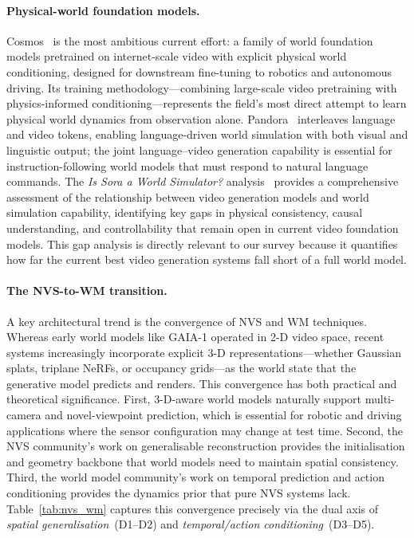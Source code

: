 \paragraph{Physical-world foundation models.}
Cosmos~\citep{agarwal2025cosmos} is the most ambitious current effort: a family
of world foundation models pretrained on internet-scale video with explicit
physical world conditioning, designed for downstream fine-tuning to robotics
and autonomous driving.
Its training methodology---combining large-scale video pretraining with
physics-informed conditioning---represents the field's most direct attempt
to learn physical world dynamics from observation alone.
Pandora~\citep{xiang2024pandora} interleaves language and video tokens,
enabling language-driven world simulation with both visual and linguistic output;
the joint language--video generation capability is essential for instruction-following
world models that must respond to natural language commands.
The \emph{Is Sora a World Simulator?} analysis~\citep{zhu2024sora_survey}
provides a comprehensive assessment of the relationship between video generation
models and world simulation capability, identifying key gaps in physical
consistency, causal understanding, and controllability that remain open
in current video foundation models.
This gap analysis is directly relevant to our survey because it quantifies how
far the current best video generation systems fall short of a full world model.

\paragraph{The NVS-to-WM transition.}
A key architectural trend is the convergence of NVS and WM techniques.
Whereas early world models like GAIA-1 operated in 2-D video space,
recent systems increasingly incorporate explicit 3-D representations---whether
Gaussian splats, triplane NeRFs, or occupancy grids---as the world state
that the generative model predicts and renders.
This convergence has both practical and theoretical significance.
First, 3-D-aware world models naturally support multi-camera and novel-viewpoint
prediction, which is essential for robotic and driving applications where the
sensor configuration may change at test time.
Second, the NVS community's work on generalisable reconstruction provides the
initialisation and geometry backbone that world models need to maintain spatial
consistency.
Third, the world model community's work on temporal prediction and action
conditioning provides the dynamics prior that pure NVS systems lack.
Table~\ref{tab:nvs_wm} captures this convergence precisely via the dual axis of
\emph{spatial generalisation}~(D1--D2) and \emph{temporal/action conditioning}~(D3--D5).

